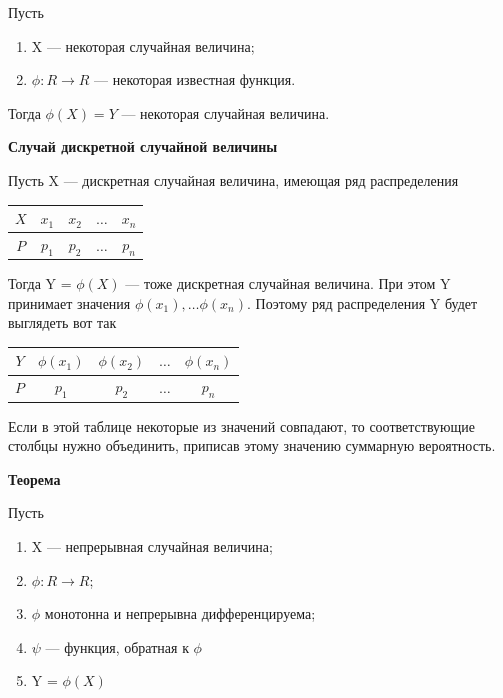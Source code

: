 Пусть

\begin{enumerate}
	\item X --- некоторая случайная величина;
	\item $\phi : R \rightarrow R$ --- некоторая известная функция. 
\end{enumerate}

Тогда $\phi(X) = Y$ --- некоторая случайная величина.

\textbf{Случай дискретной случайной величины}

Пусть X --- дискретная случайная величина, имеющая ряд распределения

\begin{table}[ht!]
	\begin{center}
		\begin{tabular}{|c|c|c|c|c|}
			\hline
			$X$ & $x_1$ & $x_2$ & $\dots$ & $x_n$ \\ 
			\hline
			$P$ & $p_1$ & $p_2$ & $\dots$ & $p_n$ \\
			\hline
		\end{tabular}
	\end{center}
\end{table}

Тогда Y = $\phi(X)$ --- тоже дискретная случайная величина. При этом Y принимает значения $\phi(x_1), \dots \phi(x_n)$. Поэтому ряд распределения Y будет выглядеть вот так

\begin{table}[ht!]
	\begin{center}
		\begin{tabular}{|c|c|c|c|c|}
			\hline
			$Y$ & $\phi(x_1)$ & $\phi(x_2)$ & $\dots$ & $\phi(x_n)$ \\ 
			\hline
			$P$ & $p_1$ & $p_2$ & $\dots$ & $p_n$ \\
			\hline
		\end{tabular}
	\end{center}
\end{table}

Если в этой таблице некоторые из значений совпадают, то соответствующие столбцы нужно объединить, приписав этому значению суммарную вероятность.

\textbf{Теорема}

Пусть

\begin{enumerate}
	\item X --- непрерывная случайная величина;
	\item $\phi : R \rightarrow R$;
	\item $\phi$ монотонна и непрерывна дифференцируема;
	\item $\psi$ --- функция, обратная к $\phi$
	\item Y = $\phi(X)$ 
\end{enumerate}

